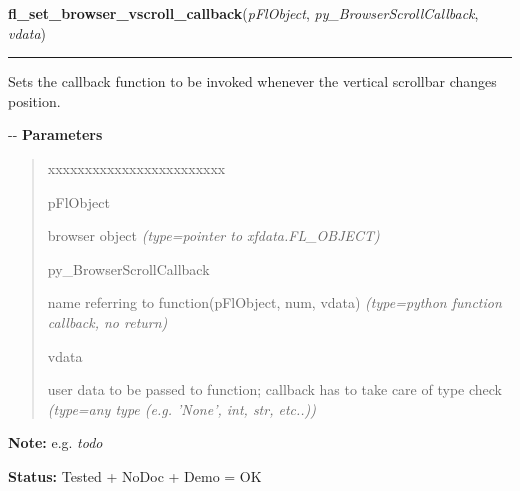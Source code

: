 \hspace{.8\funcindent}\begin{boxedminipage}{\funcwidth}

    \raggedright \textbf{fl\_set\_browser\_vscroll\_callback}(\textit{pFlObject}, \textit{py\_BrowserScrollCallback}, \textit{vdata})

    \vspace{-1.5ex}

    \rule{\textwidth}{0.5\fboxrule}
\setlength{\parskip}{2ex}

Sets the callback function to be invoked whenever the vertical
scrollbar changes position.

-{}-
\setlength{\parskip}{1ex}
      \textbf{Parameters}
      \vspace{-1ex}

      \begin{quote}
        \begin{Ventry}{xxxxxxxxxxxxxxxxxxxxxxxx}

          \item[pFlObject]


browser object
            {\it (type=pointer to xfdata.FL\_OBJECT)}

          \item[py\_BrowserScrollCallback]


name referring to function(pFlObject, num, vdata)
            {\it (type=python function callback, no return)}

          \item[vdata]


user data to be passed to function; callback has to take care of
type check
            {\it (type=any type (e.g. 'None', int, str, etc..))}

        \end{Ventry}

      \end{quote}

\textbf{Note:} 
e.g. \emph{todo}


\textbf{Status:} 
Tested + NoDoc + Demo = OK


    \end{boxedminipage}

    \label{xformslib:flbrowser:fl_get_browser_line_yoffset}

    \vspace{0.5ex}

